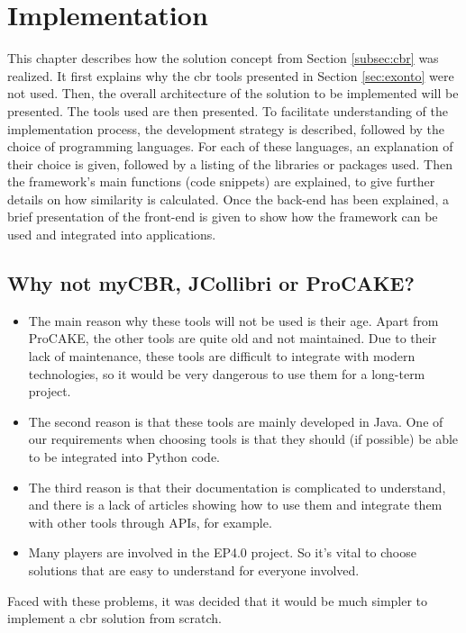 \section{Implementation\label{sec:implementation}}
This chapter describes how the solution concept from Section \ref{subsec:cbr} was realized. It first explains why the \acrshort{cbr} tools presented in Section \ref{sec:exonto} were not used. Then, the overall architecture of the solution to be implemented will be presented. The tools used are then presented. To facilitate understanding of the implementation process, the development strategy is described, followed by the choice of programming languages. For each of these languages, an explanation of their choice is given, followed by a listing of the libraries or packages used. Then the framework's main functions (code snippets) are explained, to give further details on how similarity is calculated. Once the back-end has been explained, a brief presentation of the front-end is given to show how the framework can be used and integrated into applications.

\subsection{Why not myCBR, JCollibri or ProCAKE?\label{sec:whyNot}}
\begin{itemize}
    \item The main reason why these tools will not be used is their age. Apart from ProCAKE, the other tools are quite old and not maintained. Due to their lack of maintenance, these tools are difficult to integrate with modern technologies, so it would be very dangerous to use them for a long-term project. 
    \item The second reason is that these tools are mainly developed in Java. One of our requirements when choosing tools is that they should (if possible) be able to be integrated into Python code.
    \item The third reason is that their documentation is complicated to understand, and there is a lack of articles showing how to use them and integrate them with other tools through APIs, for example. 
    \item Many players are involved in the EP4.0 project. So it's vital to choose solutions that are easy to understand for everyone involved.\\
\end{itemize}
Faced with these problems, it was decided that it would be much simpler to implement a \acrshort{cbr} solution from scratch.


